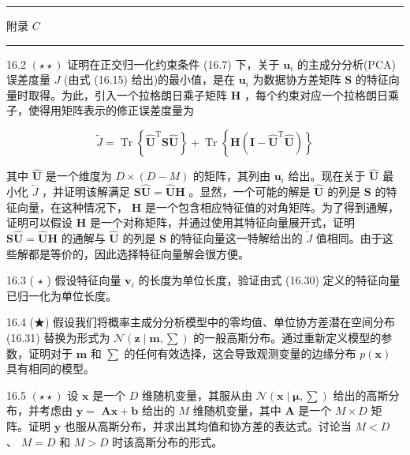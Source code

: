 \documentclass[10pt]{article}
\newcommand{\HRule}{\begin{center}\rule{0.9\linewidth}{0.2mm}\end{center}}
\begin{document}
\HRule

附录 \(C\)

\HRule

16.2 \(\left( {\star  \star  }\right)\) 证明在正交归一化约束条件 (16.7) 下，关于 \({\mathbf{u}}_{i}\) 的主成分分析(PCA)误差度量 \(J\) (由式 (16.15) 给出)的最小值，是在 \({\mathbf{u}}_{i}\) 为数据协方差矩阵 \(\mathbf{S}\) 的特征向量时取得。为此，引入一个拉格朗日乘子矩阵 \(\mathbf{H}\) ，每个约束对应一个拉格朗日乘子，使得用矩阵表示的修正误差度量为

\[
\widetilde{J} = \operatorname{Tr}\left\{  {{\widehat{\mathbf{U}}}^{\mathrm{T}}\mathbf{S}\widehat{\mathbf{U}}}\right\}   + \operatorname{Tr}\left\{  {\mathbf{H}\left( {\mathbf{I} - {\widehat{\mathbf{U}}}^{\mathrm{T}}\widehat{\mathbf{U}}}\right) }\right\}   \tag{16.87}
\]

其中 \(\widehat{\mathbf{U}}\) 是一个维度为 \(D \times  \left( {D - M}\right)\) 的矩阵，其列由 \({\mathbf{u}}_{i}\) 给出。现在关于 \(\widehat{\mathbf{U}}\) 最小化 \(\widetilde{J}\) ，并证明该解满足 \(\mathbf{S}\widehat{\mathbf{U}} = \widehat{\mathbf{U}}\mathbf{H}\) 。显然，一个可能的解是 \(\widehat{\mathbf{U}}\) 的列是 \(\mathbf{S}\) 的特征向量，在这种情况下， \(\mathbf{H}\) 是一个包含相应特征值的对角矩阵。为了得到通解，证明可以假设 \(\mathbf{H}\) 是一个对称矩阵，并通过使用其特征向量展开式，证明 \(\mathbf{S}\widehat{\mathbf{U}} = \widehat{\mathbf{U}}\mathbf{H}\) 的通解与 \(\widehat{\mathbf{U}}\) 的列是 \(\mathbf{S}\) 的特征向量这一特解给出的 \(\widetilde{J}\) 值相同。由于这些解都是等价的，因此选择特征向量解会很方便。

16.3 ( \(\star\) ) 假设特征向量 \({\mathbf{v}}_{i}\) 的长度为单位长度，验证由式 (16.30) 定义的特征向量已归一化为单位长度。

16.4 (★) 假设我们将概率主成分分析模型中的零均值、单位协方差潜在空间分布 (16.31) 替换为形式为 \(\mathcal{N}\left( {\mathbf{z} \mid  \mathbf{m},\mathbf{\sum }}\right)\) 的一般高斯分布。通过重新定义模型的参数，证明对于 \(\mathbf{m}\) 和 \(\mathbf{\sum }\) 的任何有效选择，这会导致观测变量的边缘分布 \(p\left( \mathbf{x}\right)\) 具有相同的模型。

16.5 \(\left( {\star  \star  }\right)\) 设 \(\mathbf{x}\) 是一个 \(D\) 维随机变量，其服从由 \(\mathcal{N}\left( {\mathbf{x} \mid  \mathbf{\mu },\mathbf{\sum }}\right)\) 给出的高斯分布，并考虑由 \(\mathbf{y} =\)  \(\mathbf{{Ax}} + \mathbf{b}\) 给出的 \(M\) 维随机变量，其中 \(\mathbf{A}\) 是一个 \(M \times  D\) 矩阵。证明 \(\mathbf{y}\) 也服从高斯分布，并求出其均值和协方差的表达式。讨论当 \(M < D\) 、 \(M = D\) 和 \(M > D\) 时该高斯分布的形式。
\end{document}
